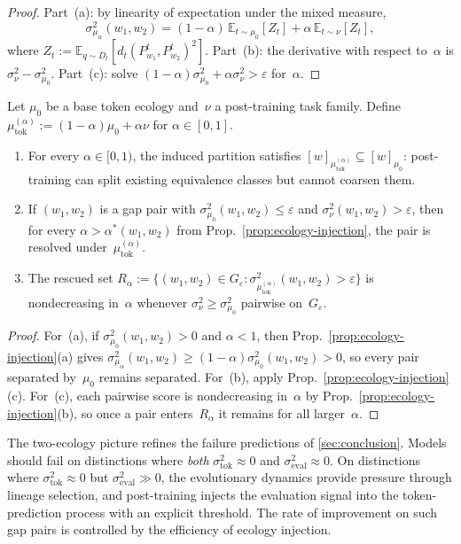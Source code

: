 \documentclass[twoside,11pt]{article}
\newcommand{\sigmasq}{\sigma^2}
\newcommand{\E}{\mathbb{E}}
\newcommand{\propref}[1]{Prop.~\ref{#1}}
\begin{document}
\begin{proof}
Part~(a): by linearity of expectation under the mixed measure,
\[
\sigmasq_{\mu_\alpha}(w_1,w_2) = (1-\alpha)\,\E_{t\sim\mu_0}[Z_t] + \alpha\,\E_{t\sim\nu}[Z_t],
\]
where $Z_t := \E_{q\sim D_t}[d_t(P^t_{w_1},P^t_{w_2})^2]$. Part~(b): the derivative with respect to~$\alpha$ is $\sigmasq_\nu - \sigmasq_{\mu_0}$. Part~(c): solve $(1-\alpha)\sigmasq_{\mu_0} + \alpha\sigmasq_\nu > \varepsilon$ for~$\alpha$.
\end{proof}

\begin{corollary}\label{cor:post-training}
Let $\mu_0$ be a base token ecology and~$\nu$ a post-training task family. Define $\mu_{\mathrm{tok}}^{(\alpha)} := (1-\alpha)\mu_0 + \alpha\nu$ for $\alpha\in[0,1]$.
\begin{enumerate}[label=(\alph*)]
\item For every $\alpha\in[0,1)$, the induced partition satisfies $[w]_{\mu_{\mathrm{tok}}^{(\alpha)}} \subseteq [w]_{\mu_0}$: post-training can split existing equivalence classes but cannot coarsen them.

\item If $(w_1,w_2)$ is a gap pair with $\sigmasq_{\mu_0}(w_1,w_2)\le\varepsilon$ and $\sigmasq_\nu(w_1,w_2)>\varepsilon$, then for every $\alpha>\alpha^*(w_1,w_2)$ from \propref{prop:ecology-injection}, the pair is resolved under~$\mu_{\mathrm{tok}}^{(\alpha)}$.

\item The rescued set $R_\alpha := \{(w_1,w_2)\in G_\varepsilon : \sigmasq_{\mu_{\mathrm{tok}}^{(\alpha)}}(w_1,w_2)>\varepsilon\}$ is nondecreasing in~$\alpha$ whenever $\sigmasq_\nu\ge\sigmasq_{\mu_0}$ pairwise on~$G_\varepsilon$.
\end{enumerate}
\end{corollary}

\begin{proof}
For~(a), if $\sigmasq_{\mu_0}(w_1,w_2)>0$ and $\alpha<1$, then \propref{prop:ecology-injection}(a) gives $\sigmasq_{\mu_\alpha}(w_1,w_2)\ge(1-\alpha)\sigmasq_{\mu_0}(w_1,w_2)>0$, so every pair separated by~$\mu_0$ remains separated. For~(b), apply \propref{prop:ecology-injection}(c). For~(c), each pairwise score is nondecreasing in~$\alpha$ by \propref{prop:ecology-injection}(b), so once a pair enters~$R_\alpha$ it remains for all larger~$\alpha$.
\end{proof}

The two-ecology picture refines the failure predictions of \cref{sec:conclusion}. Models should fail on distinctions where \emph{both} $\sigmasq_{\mathrm{tok}}\approx 0$ and $\sigmasq_{\mathrm{eval}}\approx 0$. On distinctions where $\sigmasq_{\mathrm{tok}}\approx 0$ but $\sigmasq_{\mathrm{eval}}\gg 0$, the evolutionary dynamics provide pressure through lineage selection, and post-training injects the evaluation signal into the token-prediction process with an explicit threshold. The rate of improvement on such gap pairs is controlled by the efficiency of ecology injection.
\end{document}
